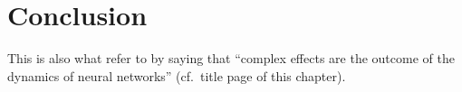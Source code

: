 
\section{Conclusion}

This is also what \citet{churchland1992computational} refer to by saying that \enquote{complex effects are the outcome of the dynamics of neural networks} (cf.~title page of this chapter).


